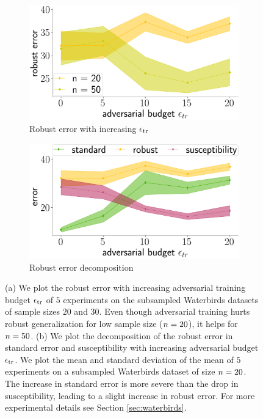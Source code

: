 \begin{figure}[!t]
\centering
\begin{subfigure}[b]{0.4\textwidth}
  \includegraphics[width=0.99\linewidth]{plotsAistats/waterbirds_motion_d_n.png}
  \caption{Robust error with increasing $\epsilon_{\text{tr}}$}
  \label{fig:motion_lines}
\end{subfigure}
\begin{subfigure}[b]{0.4\textwidth}
  \includegraphics[width=0.99\linewidth]{plotsAistats/waterbirds_trade-off.png}
  \caption{Robust error decomposition}
  \label{fig:motion_blur_trade_off}
\end{subfigure}
  \caption{ (a) We plot the robust error with increasing adversarial training budget $\epsilon_{\text{tr}}$ of $5$ experiments on the subsampled Waterbirds datasets of sample sizes $20$ and $30$. Even though adversarial training hurts robust generalization for low sample size ($n = 20$), it helps for $n = 50$.  (b) We plot the decomposition of the robust error in standard error and susceptibility with increasing adversarial budget $\epsilon_{\text{tr}}$. We plot the mean and standard deviation of the mean of $5$ experiments on a subsampled Waterbirds dataset of size $n = 20$. The increase in standard error is more severe than the drop in susceptibility, leading to a slight increase in robust error. For more experimental details see Section \ref{sec:waterbirds}.}
\label{fig:motion_blur_real_world}
\end{figure}


